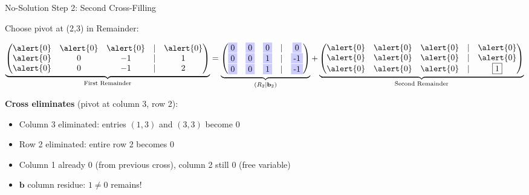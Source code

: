 \documentclass[10pt]{beamer}
\theoremstyle{definition}
\newcommand{\x}[1]{\alert{\textbf{#1}}}
\begin{document}
\begin{frame}[fragile]{No-Solution Step 2: Second Cross-Filling}

Choose pivot at (2,3) in Remainder:

$$\underbrace{\begin{pmatrix}
\alert{0} & \alert{0} & \alert{0} & | & \alert{0} \\
\alert{0} & 0 & -1 & | & 1 \\
\alert{0} & 0 & -1 & | & 2
\end{pmatrix}}_{\text{First Remainder}} = \underbrace{\begin{pmatrix}
\colorbox{blue!20}{0} & \colorbox{blue!20}{0} & \colorbox{blue!20}{0} & | & \colorbox{blue!20}{0} \\
\colorbox{blue!20}{0} & \colorbox{blue!20}{0} & \colorbox{blue!20}{1} & | & \colorbox{blue!20}{-1} \\
\colorbox{blue!20}{0} & \colorbox{blue!20}{0} & \colorbox{blue!20}{1} & | & \colorbox{blue!20}{-1}
\end{pmatrix}}_{(R_2 \mid \mathbf{b}_2)} + \underbrace{\begin{pmatrix}
\alert{0} & \alert{0} & \alert{0} & | & \alert{0} \\
\alert{0} & \alert{0} & \alert{0} & | & \alert{0} \\
\alert{0} & \alert{0} & \alert{0} & | & \boxed{1}
\end{pmatrix}}_{\text{Second Remainder}}$$

\vspace{0.5em}

\x{Cross eliminates} (pivot at column 3, row 2):
\begin{itemize}
\item \alert{Column 3} eliminated: entries $(1,3)$ and $(3,3)$ become 0
\item \alert{Row 2} eliminated: entire row 2 becomes 0
\item Column 1 already 0 (from previous cross), column 2 still 0 (free variable)
\item \alert{$\mathbf{b}$ column residue}: $\boxed{1} \neq 0$ remains!
\end{itemize}

\end{frame}
\end{document}
